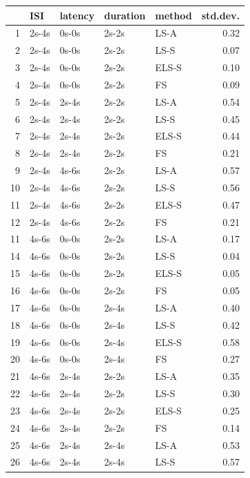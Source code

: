 \begin{table}[ht]
\centering
\begin{tabular}{rllllr}
  \hline
 & ISI & latency & duration & method & std.dev. \\ 
  \hline
  1 & 2s-4s & 0s-0s & 2s-2s & LS-A & 0.32 \\ 
  2 & 2s-4s & 0s-0s & 2s-2s & LS-S & 0.07 \\ 
  3 & 2s-4s & 0s-0s & 2s-2s & ELS-S & 0.10 \\ 
  4 & 2s-4s & 0s-0s & 2s-2s & FS & 0.09 \\
  \hline
  5 & 2s-4s & 2s-4s & 2s-2s & LS-A & 0.54 \\ 
  6 & 2s-4s & 2s-4s & 2s-2s & LS-S & 0.45 \\ 
  7 & 2s-4s & 2s-4s & 2s-2s & ELS-S & 0.44 \\ 
  8 & 2s-4s & 2s-4s & 2s-2s & FS & 0.21 \\ 
  \hline
  9 & 2s-4s & 4s-6s & 2s-2s & LS-A & 0.57 \\ 
  10 & 2s-4s & 4s-6s & 2s-2s & LS-S & 0.56 \\ 
  11 & 2s-4s & 4s-6s & 2s-2s & ELS-S & 0.47 \\ 
  12 & 2s-4s & 4s-6s & 2s-2s & FS & 0.21 \\
  \hline
  11 & 4s-6s & 0s-0s & 2s-2s & LS-A & 0.17 \\ 
  14 & 4s-6s & 0s-0s & 2s-2s & LS-S & 0.04 \\
  15 & 4s-6s & 0s-0s & 2s-2s & ELS-S & 0.05 \\ 
  16 & 4s-6s & 0s-0s & 2s-2s & FS & 0.05 \\ 
  \hline
  17 & 4s-6s & 0s-0s & 2s-4s & LS-A & 0.40 \\ 
  18 & 4s-6s & 0s-0s & 2s-4s & LS-S & 0.42 \\ 
  19 & 4s-6s & 0s-0s & 2s-4s & ELS-S & 0.58 \\ 
  20 & 4s-6s & 0s-0s & 2s-4s & FS & 0.27 \\
  \hline
  21 & 4s-6s & 2s-4s & 2s-2s & LS-A & 0.35 \\ 
  22 & 4s-6s & 2s-4s & 2s-2s & LS-S & 0.30 \\ 
  23 & 4s-6s & 2s-4s & 2s-2s & ELS-S & 0.25 \\ 
  24 & 4s-6s & 2s-4s & 2s-2s & FS & 0.14 \\
  \hline
  25 & 4s-6s & 2s-4s & 2s-4s & LS-A & 0.53 \\ 
  26 & 4s-6s & 2s-4s & 2s-4s & LS-S & 0.57 \\ 

\end{tabular}
\end{table}
